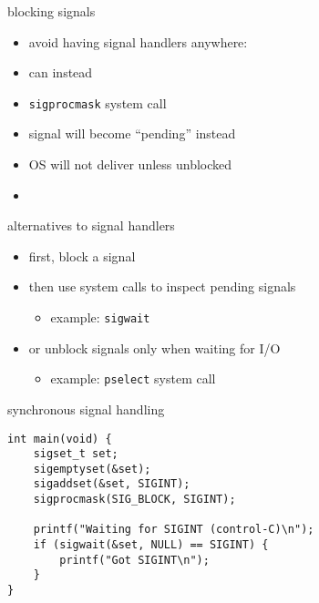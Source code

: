 \begin{frame}{blocking signals}
\begin{itemize}
\item avoid having signal handlers anywhere:
\item can instead 
\vspace{.5cm}
\item {\tt sigprocmask} system call
\item signal will become ``pending'' instead
\item OS will not deliver unless unblocked
\item {}
\end{itemize}
\end{frame}

\begin{frame}{alternatives to signal handlers}
\begin{itemize}
\item first, block a signal
\item then use system calls to inspect pending signals
    \begin{itemize}
    \item example: {\tt sigwait}
    \end{itemize}
\item or unblock signals only when waiting for I/O
    \begin{itemize}
    \item example: {\tt pselect} system call
    \end{itemize}
\end{itemize}
\end{frame}

\begin{frame}[fragile,label=syncSig]{synchronous signal handling}
\lstset{language=C,style=small}
\begin{lstlisting}
int main(void) {
    sigset_t set;
    sigemptyset(&set);
    sigaddset(&set, SIGINT);
    sigprocmask(SIG_BLOCK, SIGINT);
    
    printf("Waiting for SIGINT (control-C)\n"); 
    if (sigwait(&set, NULL) == SIGINT) {
        printf("Got SIGINT\n");
    }
}
\end{lstlisting}
\end{frame}

